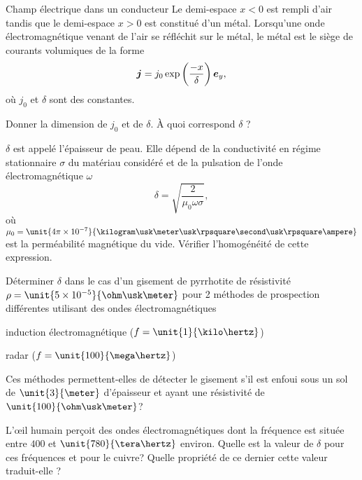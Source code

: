 \begin{td}{Champ électrique dans un conducteur}
	Le demi-espace $x < 0$ est rempli d'air tandis que le demi-espace
	$x > 0$ est constitué d'un métal. Lorsqu'une onde électromagnétique 
	venant de l'air se réfléchit sur le métal, le métal est le siège de courants
	volumiques de la forme 
	\begin{equation*}
	\vecj = j_0 \exp\left(\dfrac{-x}{\delta}\right)\ey,
	\end{equation*}
	où $j_0$ et $\delta$ sont des constantes.
	\begin{exlist}
		\item Donner la dimension de $j_0$ et de $\delta$. À quoi correspond
		  $\delta$ ?
		\item $\delta$ est appelé l'épaisseur de peau. Elle dépend de
		  la conductivité en régime stationnaire $\sigma$ du matériau considéré
		  et de la pulsation de l'onde électromagnétique $\omega$
		  \begin{equation*}
			  \delta = \sqrt{\dfrac{2}{\mu_0 \omega \sigma}},
		  \end{equation*}
		  où $\mu_0 = \unit{4 \pi \times 10^{-7}}{\kilogram \usk \meter
		  \usk \rpsquare \second \usk \rpsquare \ampere}$ 
		  est la perméabilité magnétique du vide.
		  Vérifier l'homogénéité de cette expression.
		\item Déterminer $\delta$ dans le cas d'un gisement de pyrrhotite
		  de résistivité $\rho = \unit{5 \times 10^{-5}}{\ohm \usk
		  \meter}$ pour 2 méthodes de prospection différentes utilisant des
		  ondes électromagnétiques
		  \begin{exlist}
			  \item induction électromagnétique ($f = \unit{1}{\kilo \hertz}$)
			  \item radar ($f = \unit{100}{\mega \hertz}$)
		 \end{exlist}
		 Ces méthodes permettent-elles de détecter le gisement s'il est enfoui
		 sous un sol de $\unit{3}{\meter}$ d'épaisseur et ayant une résistivité de 
		 $\unit{100}{\ohm \usk \meter}$?
	 	\item L'\oe{}il humain perçoit des ondes électromagnétiques dont la
		  fréquence est située entre $400$ et $\unit{780}{\tera \hertz}$ 
		  environ. Quelle est la valeur de $\delta$ pour ces fréquences et pour
		  le cuivre? Quelle propriété de ce dernier cette valeur traduit-elle ?
	\end{exlist}

\newpage


\end{td}
